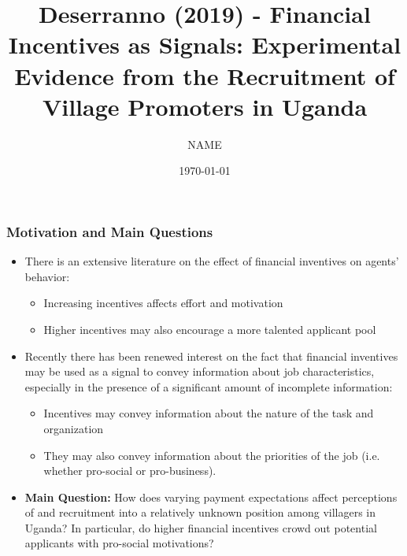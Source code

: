 \documentclass{beamer}
\title[Week 12]{Deserranno (2019) - Financial Incentives as Signals: Experimental Evidence from the Recruitment of Village Promoters in Uganda} %
\author{NAME} %
\institute[Columbia] %
{
Columbia University \\ %
{Public Economics and Development - ECOGR6307} \\
\medskip
\textit{bcv2107@columbia.edu} \\
}
\date{\today} %
\begin{document}
\begin{frame}
\titlepage %
\end{frame}








\begin{frame}
\frametitle{Motivation and Main Questions}
\small{
 

 \begin{itemize}
\item There is an extensive literature on the effect of financial inventives on agents' behavior:\medskip
\begin{itemize}
\item Increasing incentives affects effort and motivation\medskip
\item Higher incentives may also encourage a more talented applicant pool\medskip
\end{itemize}
\item Recently there has been renewed interest on the fact that financial inventives may be used as a signal to convey information about job characteristics, especially in the presence of a significant amount of incomplete information: \medskip
\begin{itemize}
\item Incentives may convey information about the nature of the task and organization\medskip
\item They may also convey information about the priorities of the job (i.e. whether pro-social or pro-business). \medskip
\end{itemize}
\item \textbf{Main Question:} How does varying payment expectations affect perceptions of and recruitment into a relatively unknown position among villagers in Uganda? In particular, do higher financial incentives crowd out potential applicants with pro-social motivations? \medskip


\end{itemize}

}
\end{frame}
\end{document}
